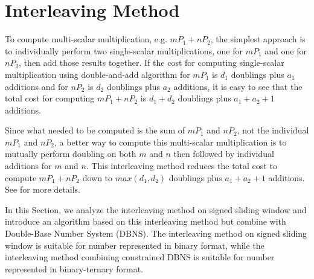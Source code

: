\section{Interleaving Method}
\label{sec:interleaving}
To compute multi-scalar multiplication, e.g. $mP_1 + nP_2$,
the simplest approach is to individually perform two single-scalar multiplications,
one for $mP_1$ and one for$nP_2$, then add those results together.
If the cost for computing single-scalar multiplication using double-and-add algorithm
for $mP_1$ is $d_1$ doublings plus $a_1$ additions and for $nP_2$ is $d_2$ doublings plus $a_2$ additions,
it is easy to see that the total cost for computing $mP_1 + nP_2$ is $d_1 + d_2$ doublings plus $a_1 + a_2 + 1$ additions.

Since what needed to be computed is the sum of $mP_1$ and $nP_2$, not the individual $mP_1$ and $nP_2$,
a better way to compute this multi-scalar multiplication is to mutually perform doubling on both $m$ and $n$
then followed by individual additions for $m$ and $n$.
This interleaving method reduces the total cost to compute $mP_1 + nP_2$ down to
$max(d_1,d_2)$ doublings plus $a_1 + a_2 + 1$ additions.
See \cite{DI08} for more details.


In this Section, we analyze the interleaving method on signed sliding window \cite{interleaving}
and introduce an algorithm based on this interleaving method but combine with Double-Base Number System (DBNS).
The interleaving method on signed sliding window is suitable for number represented in binary format,
while the interleaving method combining constrained DBNS is suitable for number represented in binary-ternary format.



